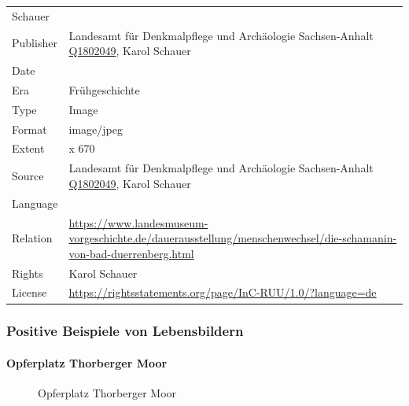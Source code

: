 \documentclass[
  letterpaper,
  DIV=11,
  numbers=noendperiod]{scrartcl}
\let\oldparagraph\paragraph
\renewcommand{\paragraph}[1]{\oldparagraph{#1}\mbox{}}
\begin{document}
\begin{longtable}[]{@{}
  >{\raggedright\arraybackslash}p{}
  >{\raggedright\arraybackslash}p{}@{}}
Schauer \\
Publisher & Landesamt für Denkmalpflege und Archäologie Sachsen-Anhalt
\href{https://www.wikidata.org/wiki/Q1802049}{Q1802049}, Karol
Schauer \\
Date & \\
Era & Frühgeschichte \\
Type & Image \\
Format & image/jpeg \\
Extent & 551 x 670 \\
Source & Landesamt für Denkmalpflege und Archäologie Sachsen-Anhalt
\href{https://www.wikidata.org/wiki/Q1802049}{Q1802049}, Karol
Schauer \\
Language & \\
Relation &
\url{https://www.landesmuseum-vorgeschichte.de/dauerausstellung/menschenwechsel/die-schamanin-von-bad-duerrenberg.html} \\
Rights & Karol Schauer \\
License &
\url{https://rightsstatements.org/page/InC-RUU/1.0/?language=de} \\
\end{longtable}

\subsubsection{Positive Beispiele von
Lebensbildern}\label{positive-beispiele-von-lebensbildern}

\paragraph{Opferplatz Thorberger Moor}\label{opferplatz-thorberger-moor}

\begin{figure}


\caption{\label{fig-opferplatz-thorberger-moor}Opferplatz Thorberger
Moor}

\end{figure}%
\end{document}
